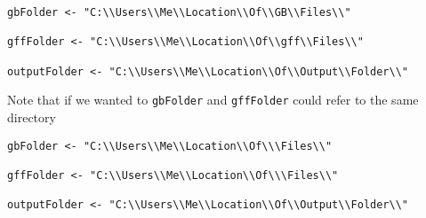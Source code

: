 \documentclass[]{article}
\begin{document}
\begin{verbatim}
gbFolder <- "C:\\Users\\Me\\Location\\Of\\GB\\Files\\"

gffFolder <- "C:\\Users\\Me\\Location\\Of\\gff\\Files\\"

outputFolder <- "C:\\Users\\Me\\Location\\Of\\Output\\Folder\\"
\end{verbatim}

Note that if we wanted to \texttt{gbFolder} and \texttt{gffFolder} could
refer to the same directory

\begin{verbatim}
gbFolder <- "C:\\Users\\Me\\Location\\Of\\\Files\\"

gffFolder <- "C:\\Users\\Me\\Location\\Of\\\Files\\"

outputFolder <- "C:\\Users\\Me\\Location\\Of\\Output\\Folder\\"
\end{verbatim}
\end{document}
